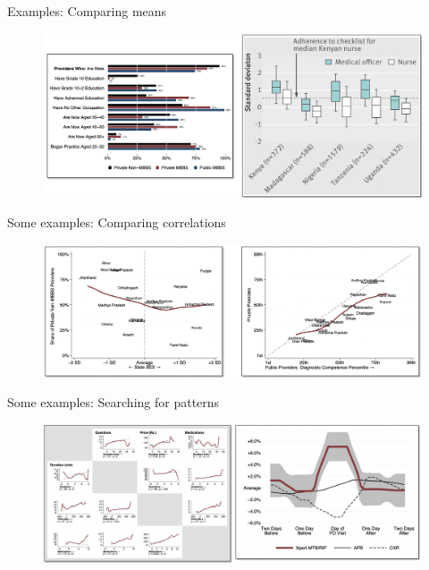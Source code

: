 \documentclass[aspectratio=169]{beamer}
\begin{document}
\begin{frame}{Examples: Comparing means}
	
	\begin{figure}
		\centering
		\includegraphics[width=\linewidth]{img/Distribution2}
	\end{figure}
	
\end{frame}


\begin{frame}{Some examples: Comparing correlations}
	
	\begin{figure}
		\centering
		\includegraphics[width=\linewidth]{img/Correlation}
	\end{figure}
	
\end{frame}


\begin{frame}{Some examples: Searching for patterns}
	
	\begin{figure}
		\centering
		\includegraphics[width=\linewidth]{img/Correlation2}
	\end{figure}
	
\end{frame}
\end{document}
